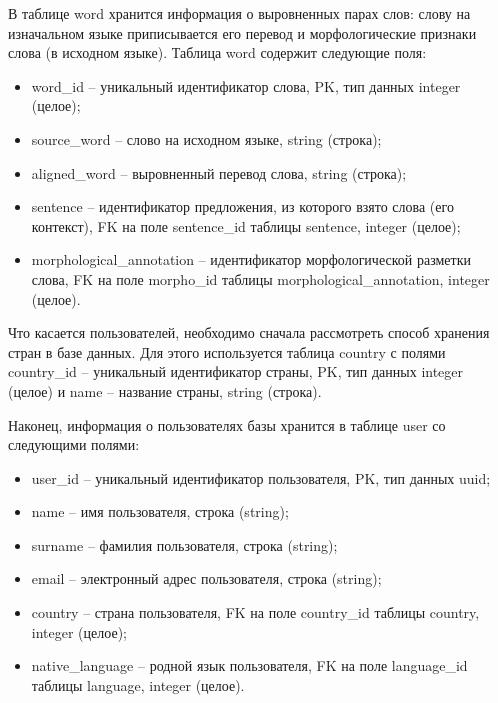 В таблице word хранится информация о выровненных парах слов: слову на изначальном языке приписывается его перевод и морфологические признаки слова (в исходном языке). 
Таблица word содержит следующие поля:

\begin{itemize}[label=---]
	\item word\_id -- уникальный идентификатор слова, PK, тип данных integer (целое);
	
	\item source\_word -- слово на исходном языке, string (строка);
	
	\item aligned\_word -- выровненный перевод слова, string (строка);
	
	\item sentence -- идентификатор предложения, из которого взято слова (его контекст), FK на поле sentence\_id таблицы sentence, integer (целое);
	
	\item morphological\_annotation -- идентификатор морфологической разметки\\ слова, FK на поле morpho\_id таблицы morphological\_annotation, integer (целое).
\end{itemize}

Что касается пользователей, необходимо сначала рассмотреть способ хранения стран в базе данных. 
Для этого используется таблица country с полями country\_id -- уникальный идентификатор страны, PK, тип данных integer (целое) и name -- название страны, string (строка).

Наконец, информация о пользователях базы хранится в таблице user со следующими полями:

\begin{itemize}[label=---]
	\item user\_id -- уникальный идентификатор пользователя, PK, тип данных uuid;
	
	\item name -- имя пользователя, строка (string);
	
	\item surname -- фамилия пользователя, строка (string);
	
	\item email -- электронный адрес пользователя, строка (string);
	
	\item country -- страна пользователя, FK на поле country\_id таблицы country, integer (целое);
	
	\item native\_language -- родной язык пользователя, FK на поле language\_id таблицы language, integer (целое).
\end{itemize}

